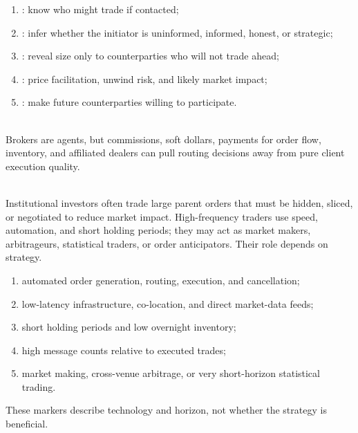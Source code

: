 \begin{taxonomy} 
\begin{enumerate}[label=\roman*.]
\setlength{\itemsep}{0pt}
\item {}: know who might trade if contacted;
\item {}: infer whether the initiator is uninformed, informed, honest, or strategic;
\item {}: reveal size only to counterparties who will not trade ahead;
\item {}: price facilitation, unwind risk, and likely market impact;
\item {}: make future counterparties willing to participate.
\end{enumerate}
\end{taxonomy}

\begin{caveat} \\
Brokers are agents, but commissions, soft dollars, payments for order flow, inventory, and affiliated dealers can pull routing decisions away from pure client execution quality.
\end{caveat}

\begin{practitionernote} \\
Institutional investors often trade large parent orders that must be hidden, sliced, or negotiated to reduce market impact. High-frequency traders use speed, automation, and short holding periods; they may act as market makers, arbitrageurs, statistical traders, or order anticipators. Their role depends on strategy.
\end{practitionernote}

\begin{taxonomy} 
\begin{enumerate}[label=\roman*.]
\setlength{\itemsep}{0pt}
\item automated order generation, routing, execution, and cancellation;
\item low-latency infrastructure, co-location, and direct market-data feeds;
\item short holding periods and low overnight inventory;
\item high message counts relative to executed trades;
\item market making, cross-venue arbitrage, or very short-horizon statistical trading.
\end{enumerate}
These markers describe technology and horizon, not whether the strategy is beneficial.
\end{taxonomy}

